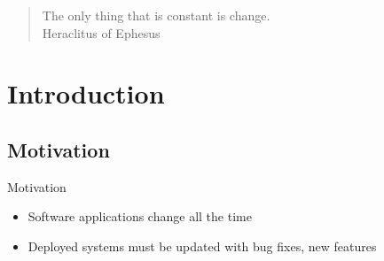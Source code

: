 
{
\begin{frame}
\begin{block}{}
\begin{quote}
The only thing that is constant is change.\\
\hfill Heraclitus of Ephesus
\end{quote}
\end{block}
\end{frame}
}

{
\section{Introduction}
\subsection{Motivation}
\begin{frame}{Motivation}%
\begin{itemize}
\item Software applications change all the time
\item Deployed systems must be updated with bug fixes, new features
\end{itemize}
\vspace{1ex}
\end{frame}
}

